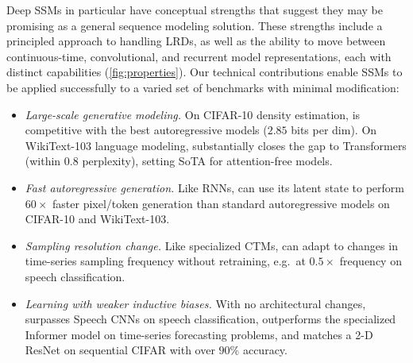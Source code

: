 Deep SSMs in particular have conceptual strengths that suggest they may be promising as a general sequence modeling solution.
These strengths include a principled approach to handling LRDs, as well as the ability to move between continuous-time, convolutional, and recurrent model representations, each with distinct capabilities (\cref{fig:properties}). %
Our technical contributions enable SSMs to be applied successfully to a varied set of benchmarks with minimal modification: %
\begin{itemize}[leftmargin=*]
    \item {\it Large-scale generative modeling.}
        On CIFAR-10 density estimation, \methodabbrv{} is competitive with the best autoregressive models ($2.85$ bits per dim). On WikiText-103 language modeling, \methodabbrv{} substantially closes the gap to Transformers (within $0.8$ perplexity), setting SoTA for attention-free models.
    \item {\it Fast autoregressive generation.}
        Like RNNs, \methodabbrv{} can use its latent state to perform $60\times$ faster pixel/token generation than standard autoregressive models on CIFAR-10 and WikiText-103.
    \item {\it Sampling resolution change.}
        Like specialized CTMs, \methodabbrv{} can adapt to changes in time-series sampling frequency without retraining, e.g.\ at $0.5\times$ frequency on speech classification.
    \item {\it Learning with weaker inductive biases.}
        With no architectural changes, \methodabbrv{} surpasses Speech CNNs on speech classification, outperforms the specialized Informer model on time-series forecasting problems,
        and matches a 2-D ResNet on sequential CIFAR with over $90\%$ accuracy.



\end{itemize}









